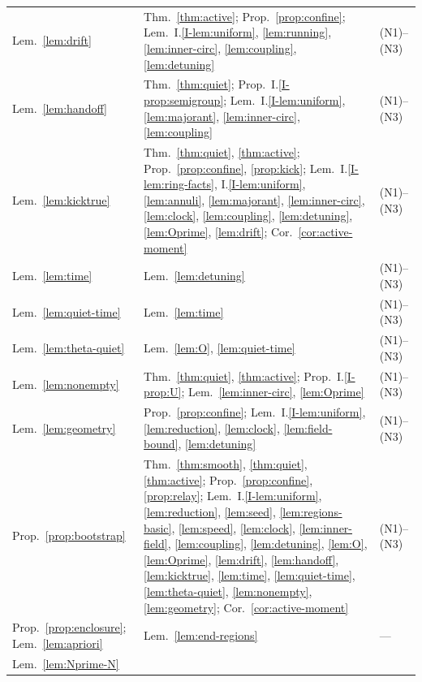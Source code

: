 \begin{longtable}{p{}p{}p{}}
\raggedright Lem.~\ref{lem:drift}
  & \raggedright Thm.~\ref{thm:active}; Prop.~\ref{prop:confine}; Lem.~I.\ref{I-lem:uniform}, \ref{lem:running}, \ref{lem:inner-circ}, \ref{lem:coupling}, \ref{lem:detuning} & (N1)--(N3) \\
\raggedright Lem.~\ref{lem:handoff}
  & \raggedright Thm.~\ref{thm:quiet}; Prop.~I.\ref{I-prop:semigroup}; Lem.~I.\ref{I-lem:uniform}, \ref{lem:majorant}, \ref{lem:inner-circ}, \ref{lem:coupling} & (N1)--(N3) \\
\raggedright Lem.~\ref{lem:kicktrue}
  & \raggedright Thm.~\ref{thm:quiet}, \ref{thm:active}; Prop.~\ref{prop:confine}, \ref{prop:kick}; Lem.~I.\ref{I-lem:ring-facts}, I.\ref{I-lem:uniform}, \ref{lem:annuli}, \ref{lem:majorant}, \ref{lem:inner-circ}, \ref{lem:clock}, \ref{lem:coupling}, \ref{lem:detuning}, \ref{lem:Oprime}, \ref{lem:drift}; Cor.~\ref{cor:active-moment} & (N1)--(N3) \\
\raggedright Lem.~\ref{lem:time}
  & \raggedright Lem.~\ref{lem:detuning} & (N1)--(N3) \\
\raggedright Lem.~\ref{lem:quiet-time}
  & \raggedright Lem.~\ref{lem:time} & (N1)--(N3) \\
\raggedright Lem.~\ref{lem:theta-quiet}
  & \raggedright Lem.~\ref{lem:O}, \ref{lem:quiet-time} & (N1)--(N3) \\
\raggedright Lem.~\ref{lem:nonempty}
  & \raggedright Thm.~\ref{thm:quiet}, \ref{thm:active}; Prop.~I.\ref{I-prop:U}; Lem.~\ref{lem:inner-circ}, \ref{lem:Oprime} & (N1)--(N3) \\
\raggedright Lem.~\ref{lem:geometry}
  & \raggedright Prop.~\ref{prop:confine}; Lem.~I.\ref{I-lem:uniform}, \ref{lem:reduction}, \ref{lem:clock}, \ref{lem:field-bound}, \ref{lem:detuning} & (N1)--(N3) \\
\raggedright Prop.~\ref{prop:bootstrap}
  & \raggedright Thm.~\ref{thm:smooth}, \ref{thm:quiet}, \ref{thm:active}; Prop.~\ref{prop:confine}, \ref{prop:relay}; Lem.~I.\ref{I-lem:uniform}, \ref{lem:reduction}, \ref{lem:seed}, \ref{lem:regions-basic}, \ref{lem:speed}, \ref{lem:clock}, \ref{lem:inner-field}, \ref{lem:coupling}, \ref{lem:detuning}, \ref{lem:O}, \ref{lem:Oprime}, \ref{lem:drift}, \ref{lem:handoff}, \ref{lem:kicktrue}, \ref{lem:time}, \ref{lem:quiet-time}, \ref{lem:theta-quiet}, \ref{lem:nonempty}, \ref{lem:geometry}; Cor.~\ref{cor:active-moment} & (N1)--(N3) \\
\raggedright Prop.~\ref{prop:enclosure}; Lem.~\ref{lem:apriori}
  & \raggedright Lem.~\ref{lem:end-regions} & --- \\
\raggedright Lem.~\ref{lem:Nprime-N}

\end{longtable}
